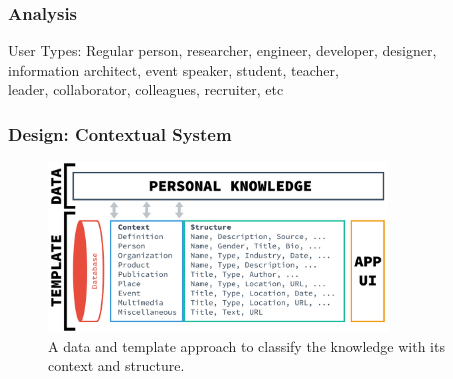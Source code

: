 \documentclass[10pt, compress]{beamer}
\begin{document}

\begin{frame}[fragile]
  \frametitle{Analysis}

    \begin{block}{User Types:}
      Regular person, researcher, engineer, developer, designer,\\
      information architect, event speaker, student, teacher,\\
      leader, collaborator, colleagues, recruiter, etc
    \end{block}

\end{frame}


\begin{frame}[fragile]
  \frametitle{Design: Contextual System}

  \begin{figure}[ht]
    \centering
    \includegraphics[width=9cm]{include/satellid-contextual.png}
    \caption{A data and template approach to classify the knowledge with its context and structure.}
    \label{fig:satellid-contextual}
  \end{figure}

\end{frame}

\end{document}
